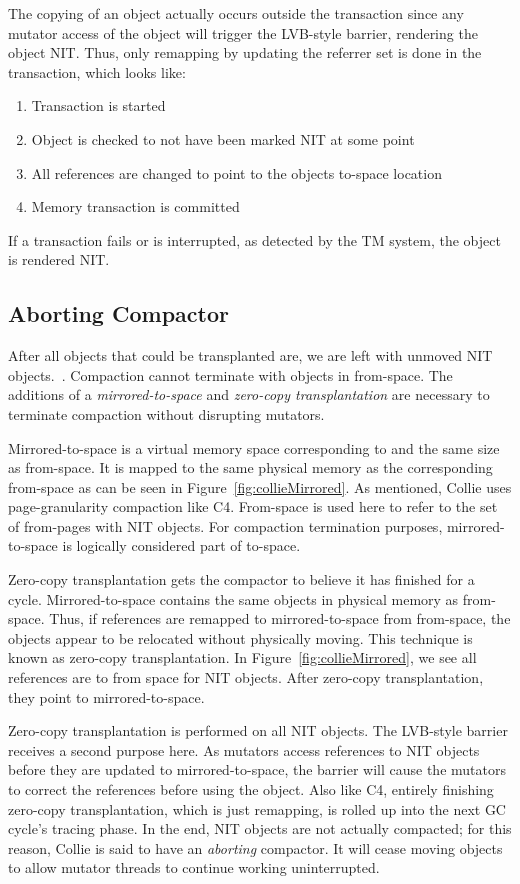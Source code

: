 \documentclass{sig-alternate}
\begin{document}
The copying of an object actually occurs outside the transaction since any
mutator access of the object will trigger the LVB-style barrier,
rendering the object NIT. Thus, only remapping by updating the referrer set
is done in the transaction, which looks like:
\begin{enumerate}
\item Transaction is started
\item Object is checked to not have been marked NIT at some point
\item All references are changed to point to the objects to-space location
\item Memory transaction is committed
\end{enumerate}
If a transaction fails or is interrupted, as detected by the TM system, the object is rendered NIT.


\subsection{Aborting Compactor}
\label{sec:collieAbortion}

After all objects that could be transplanted are, we
are left with unmoved NIT objects.~\cite{Iyengar:Collie}.
Compaction cannot terminate with objects in from-space.
The additions of a \emph{mirrored-to-space} and \emph{zero-copy transplantation} are necessary
to terminate compaction without disrupting mutators.

Mirrored-to-space is a virtual memory space corresponding to and the same
size as from-space. It is mapped to the same physical
memory as the corresponding from-space as can be seen in Figure~\ref{fig:collieMirrored}. As mentioned, 
Collie uses page-granularity compaction like C4. From-space is used here 
to refer to the set of from-pages with NIT objects. For compaction 
termination purposes, mirrored-to-space is logically considered part of to-space.

Zero-copy transplantation gets the compactor to believe it has finished for a cycle.
Mirrored-to-space contains the same objects in physical memory as from-space.
Thus, if references
are remapped to mirrored-to-space from from-space,
the objects appear to be relocated without physically moving. This technique
is known as zero-copy transplantation. In Figure~\ref{fig:collieMirrored},
we see all references are to from space for NIT objects. After zero-copy transplantation, they
point to mirrored-to-space.

Zero-copy transplantation
is performed on all NIT objects. The LVB-style barrier receives a second purpose here. As mutators
access references to NIT objects before they are updated to mirrored-to-space, 
the barrier will cause the mutators to correct the references before using the object. Also like
C4, entirely finishing zero-copy transplantation, which is just remapping, is rolled
up into the next GC cycle's tracing phase. In the end, NIT objects are not actually compacted;
for this reason, Collie is said to have an \emph{aborting} compactor. It will
cease moving objects to allow mutator threads to continue working uninterrupted.
\end{document}
